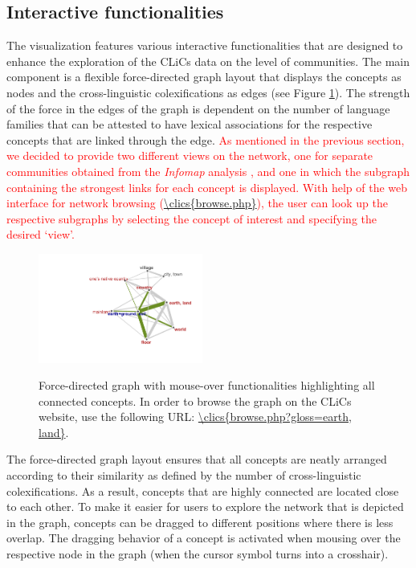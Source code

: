 \subsection{Interactive functionalities}



The visualization features various interactive functionalities that are designed to enhance the exploration of the CLiCs data on the level of communities. The main component is a flexible force-directed graph layout that displays the concepts as nodes and the cross-linguistic colexifications as edges (see Figure \ref{EarthLand}). The strength of the force in the edges of the graph is dependent on the number of language families that can be attested to have lexical associations for the respective concepts that are linked through the edge. \textcolor{red}{As mentioned in the previous section, we decided to provide two different views on the network, one for separate communities obtained from the \emph{Infomap} analysis \cite{Rosvall2008}, and one in which the subgraph containing the strongest links for each concept is displayed.  With help of the web interface for network browsing (\url{\clics{browse.php}}), the user can look up the respective subgraphs by selecting the concept of interest and specifying the desired `view'.}

\begin{figure}[htbp]
    \centering
    \href{\clics{browse.php?gloss=earth,
    land}}{\includegraphics[width=0.48\textwidth,trim=5cm 2cm 1cm 1cm]{img/earthland2.pdf}}
\caption{Force-directed graph with mouse-over functionalities highlighting all connected concepts.
In order to browse the graph on the CLiCs website, use the following URL: \url{\clics{browse.php?gloss=earth,
land}}.}
\label{EarthLand}
\end{figure}

The force-directed graph layout ensures that all concepts are neatly arranged according to their similarity as defined by the number of cross-linguistic colexifications. As a result, concepts that are highly connected are located close to each other.  To make it easier for users to explore the network that is depicted in the graph, concepts can be dragged to different positions where there is less overlap. The dragging behavior of a concept  is activated when mousing over the respective node in the graph (when the cursor symbol turns into a crosshair).


